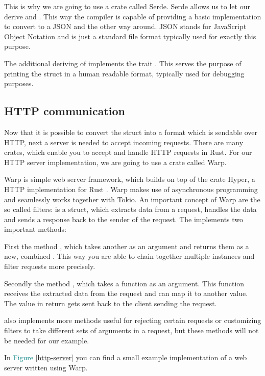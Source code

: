 This is why we are going to use a crate called Serde. Serde allows us to let our  derive 
and . This way the compiler is capable of providing a basic implementation to convert  to
a JSON  and the other way around. JSON stands for JavaScript Object Notation and is just a standard file
format typically used for exactly this purpose.

The additional deriving of  implements the trait . This serves the purpose of
printing the struct in a human readable format, typically used for debugging purposes.

\subsection{HTTP communication}
Now that it is possible to convert the struct into a format which is sendable over HTTP, next a server is needed to
accept incoming requests. There are many crates, which enable you to accept and handle HTTP requests in Rust. For our
HTTP server implementation, we are going to use a crate called Warp.

Warp is simple web server framework, which builds on top of the crate Hyper, a HTTP implementation for Rust
\cite{warp-doc}. Warp makes use of asynchronous programming and seamlessly works together with Tokio. An important
concept of Warp are the so called filters:  is a struct, which extracts data from a request, handles
the data and sends a response back to the sender of the request. The  implements two important methods:

First the method , which takes another  as an argument and returns
them as a new, combined . This way you are able to chain together multiple  instances and
filter requests more precisely.

Secondly the method , which takes a function as an argument. This function receives the extracted data from
the request and can map it to another value. The value in return gets sent back to the client sending the request.

 also implements more methods useful for rejecting certain requests or customizing filters to take
different sets of arguments in a request, but these methods will not be needed for our example.

In \textcolor{teal}{Figure \ref{http-server}} you can find a small example implementation of a web server written using Warp.

